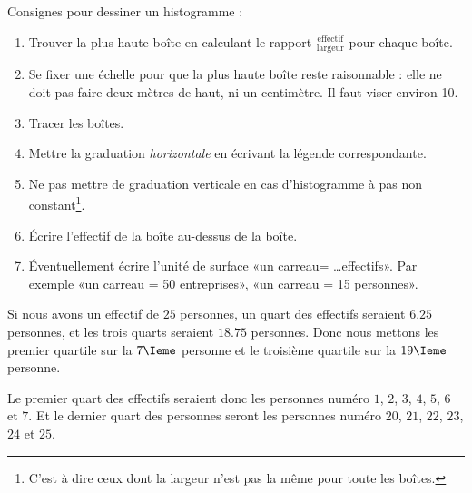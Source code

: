 Consignes pour dessiner un histogramme :
\begin{enumerate}
    \item
        Trouver la plus haute boîte en calculant le rapport \( \frac{ \text{effectif} }{ \text{largeur} }\) pour chaque boîte.
    \item
        Se fixer une échelle pour que la plus haute boîte reste raisonnable : elle ne doit pas faire deux mètres de haut, ni un centimètre. Il faut viser environ \unit{10}{\centi\meter}.
    \item
        Tracer les boîtes.
    \item
        Mettre la graduation \emph{horizontale} en écrivant la légende correspondante.
    \item
        Ne pas mettre de graduation verticale en cas d'histogramme à pas non constant\footnote{C'est à dire ceux dont la largeur n'est pas la même pour toute les boîtes.}.
    \item
        Écrire l'effectif de la boîte au-dessus de la boîte.
    \item
        Éventuellement écrire l'unité de surface «un carreau= \ldots effectifs». Par exemple «un carreau = 50 entreprises», «un carreau = 15 personnes».
\end{enumerate}



\begin{example}
    Si nous avons un effectif de \( 25\) personnes, un quart des effectifs seraient \( 6.25\) personnes, et les trois quarts seraient \( 18.75\) personnes. Donc nous mettons les premier quartile sur la \( 7\Ieme\) personne et le troisième quartile sur la \( 19\Ieme\) personne.

    Le premier quart des effectifs seraient donc les personnes numéro \( 1\), \( 2\), \( 3\), \( 4\), \( 5\), \( 6\) et \( 7\). Et le dernier quart des personnes seront les personnes numéro \( 20\), \( 21\), \( 22\), \( 23\), \( 24\) et \( 25\).
\end{example}
